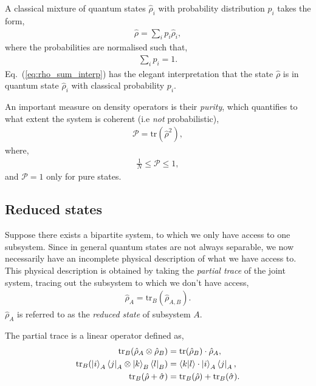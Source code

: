 \documentclass[aps,pra,twocolumn,amsmath,amssymb,nofootinbib,superscriptaddress]{revtex4}
\begin{document}
A classical mixture of quantum states $\hat\rho_i$ with probability distribution $p_i$ takes the form,
\begin{align}\label{eq:rho_sum_interp}
	\hat\rho = \sum_i p_i \hat\rho_i,
\end{align}
where the probabilities are normalised such that,
\begin{align}
	\sum_i p_i = 1.
\end{align}
Eq.~(\ref{eq:rho_sum_interp}) has the elegant interpretation that the state $\hat\rho$ is in quantum state $\hat\rho_i$ with classical probability $p_i$.

An important measure on density operators is their \textit{purity}, which quantifies to what extent the system is coherent (i.e \textit{not} probabilistic),
\begin{align}
\mathcal{P} = \mathrm{tr}(\hat\rho^2),
\end{align}
where,
\begin{align}
\frac{1}{N}\leq \mathcal{P}\leq 1,	
\end{align}
and \mbox{$\mathcal{P}=1$} only for pure states.

%
%

\subsection{Reduced states}

Suppose there exists a bipartite system, to which we only have access to one subsystem. Since in general quantum states are not always separable, we now necessarily have an incomplete physical description of what we have access to. This physical description is obtained by taking the \textit{partial trace} of the joint system, tracing out the subsystem to which we don't have access,
\begin{align}
\hat\rho_A = \mathrm{tr}_B(\hat\rho_{A,B}).	
\end{align}
$\hat\rho_A$ is referred to as the \textit{reduced state} of subsystem $A$.

The partial trace is a linear operator defined as,
\begin{align}
\mathrm{tr}_B(\hat\rho_A\otimes\hat\rho_B) &= \mathrm{tr}(\hat\rho_B) \cdot \hat\rho_A,\nonumber\\
\mathrm{tr}_B(\ket{i}_A\bra{j}_A\otimes\ket{k}_B\bra{l}_B) &= \braket{k|l}\cdot\ket{i}_A\bra{j}_A,\nonumber\\
\mathrm{tr}_B(\hat\rho+\hat\sigma) &= \mathrm{tr}_B(\hat\rho) + \mathrm{tr}_B(\hat\sigma).
\end{align}
\end{document}

